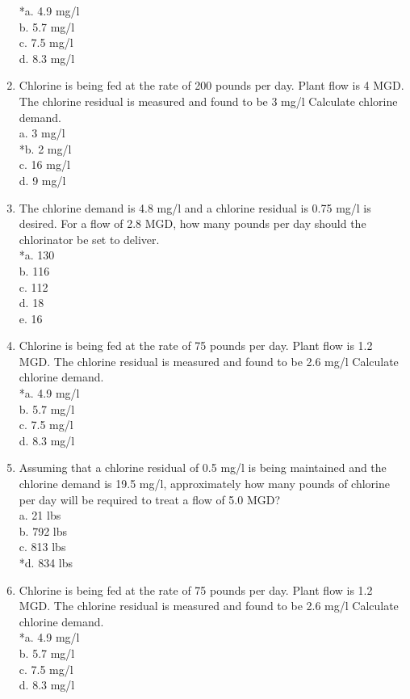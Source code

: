 \begin{enumerate}
*a. 4.9 mg/l \\
b. 5.7 mg/l \\
c. 7.5 mg/l \\
d. 8.3 mg/l \\
\item Chlorine is being fed at the rate of 200 pounds per day. Plant flow is 4 MGD. The chlorine residual is measured and found to be 3 mg/l Calculate chlorine demand. \\
a. 3 mg/l \\
*b. 2 mg/l \\
c. 16 mg/l \\
d. 9 mg/l \\
\item The chlorine demand is 4.8 mg/l and a chlorine residual is 0.75 mg/l is desired.  For a flow of 2.8 MGD, how many pounds per day should the chlorinator be set to deliver. \\
*a. 130 \\
b. 116 \\
c. 112 \\
d. 18 \\
e. 16 \\
\item Chlorine is being fed at the rate of 75 pounds per day. Plant flow is 1.2 MGD. The chlorine residual is measured and found to be 2.6 mg/l Calculate chlorine demand. \\
*a. 4.9 mg/l \\
b. 5.7 mg/l \\
c. 7.5 mg/l \\
d. 8.3 mg/l \\
\item Assuming that a chlorine residual of 0.5 mg/l is being maintained and the chlorine demand is 19.5 mg/l, approximately how many pounds of chlorine per day will be required to treat a flow of 5.0 MGD? \\
a. 21 lbs \\
b. 792 lbs \\
c. 813 lbs \\
*d. 834 lbs \\
\item Chlorine is being fed at the rate of 75 pounds per day. Plant flow is 1.2 MGD. The chlorine residual is measured and found to be 2.6 mg/l Calculate chlorine demand. \\
*a. 4.9 mg/l \\
b. 5.7 mg/l \\
c. 7.5 mg/l \\
d. 8.3 mg/l \\

\end{enumerate}

